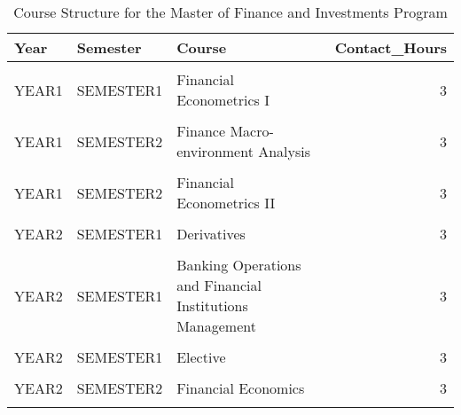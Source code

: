 \documentclass[16,a4paperpaper,]{article}
\begin{document}
\begin{table}[!h]

\caption{\label{tab:unnamed-chunk-2}Course Structure for the Master of Finance and Investments Program}
\centering
\fontsize{10}{12}\selectfont
\begin{tabular}[t]{lllr}
\toprule
Year & Semester & Course & Contact\_Hours\\
\midrule
\cellcolor{gray!6}{YEAR1} & \cellcolor{gray!6}{SEMESTER1} & \cellcolor{gray!6}{Microeconomics} & \cellcolor{gray!6}{3}\\
YEAR1 & SEMESTER1 & Financial Econometrics I & 3\\
\cellcolor{gray!6}{YEAR1} & \cellcolor{gray!6}{SEMESTER1} & \cellcolor{gray!6}{Investments} & \cellcolor{gray!6}{3}\\
YEAR1 & SEMESTER2 & Finance Macro-environment Analysis & 3\\
\cellcolor{gray!6}{YEAR1} & \cellcolor{gray!6}{SEMESTER2} & \cellcolor{gray!6}{Research Project} & \cellcolor{gray!6}{45}\\
\addlinespace
YEAR1 & SEMESTER2 & Financial Econometrics II & 3\\
\cellcolor{gray!6}{YEAR2} & \cellcolor{gray!6}{SEMESTER1} & \cellcolor{gray!6}{Financial Statements Analysis and Disclosures} & \cellcolor{gray!6}{3}\\
YEAR2 & SEMESTER1 & Derivatives & 3\\
\cellcolor{gray!6}{YEAR2} & \cellcolor{gray!6}{SEMESTER1} & \cellcolor{gray!6}{Mathematical Methods for Finance} & \cellcolor{gray!6}{3}\\
YEAR2 & SEMESTER1 & Banking Operations and Financial Institutions Management & 3\\
\addlinespace
\cellcolor{gray!6}{YEAR2} & \cellcolor{gray!6}{SEMESTER1} & \cellcolor{gray!6}{Research Methods} & \cellcolor{gray!6}{3}\\
YEAR2 & SEMESTER1 & Elective & 3\\
\cellcolor{gray!6}{YEAR2} & \cellcolor{gray!6}{SEMESTER2} & \cellcolor{gray!6}{Corporate Finance and Corporate Governance} & \cellcolor{gray!6}{3}\\
YEAR2 & SEMESTER2 & Financial Economics & 3\\
\cellcolor{gray!6}{YEAR2} & \cellcolor{gray!6}{SEMESTER2} & \cellcolor{gray!6}{Asset Pricing Theory} & \cellcolor{gray!6}{3}\\
\bottomrule
\end{tabular}
\end{table}
\end{document}
